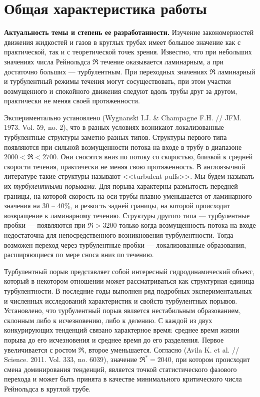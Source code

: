 \nocite{Vest18, MZG2017, MZG2015, Kazan2015, KMU2016, KMU2015, KMU2014} %
\nocite{Lomonosov2018, Lomonosov2017, Lomonosov2016, Lomonosov2015, Lomonosov2014, LomRead2017, LomRead2016, LomRead2014, NeZaTeGiUs2016, NeZaTeGiUs2014, Bur2016, Bur2014, Ob2018, ICMAR2016, Kazan2015conf}

\section*{\centering  Общая характеристика работы}

\textbf{Актуальность темы и степень ее разработанности.}
Изучение закономерностей движения жидкостей и газов в круглых трубах имеет большое значение как с практической, так и с теоретической точек зрения. Известно, что при небольших значениях числа Рейнольдса $\Re$ течение оказывается ламинарным, а при достаточно больших --- турбулентным. При переходных значениях $\Re$ ламинарный и турбулентный режимы течения могут сосуществовать, при этом участки возмущенного и спокойного движения следуют вдоль трубы друг за другом, практически не меняя своей протяженности. 

Экспериментально установлено (Wygnanski I.J. \& Champagne F.H. // JFM. 1973. Vol. 59, no. 2), что в разных условиях возникают локализованные турбулентные структуры заметно разных типов. Структуры первого типа появляются при сильной возмущенности потока на входе в трубу в диапазоне $2000<\Re<2700$. Они сносятся вниз по потоку со скоростью, близкой к средней скорости течения, практически не меняя свою протяженность. В англоязычной литературе такие структуры называют <<turbulent puffs>>. Мы будем называть их \textit{турбулентными порывами}. Для порыва характерны размытость передней границы, на которой скорость на оси трубы плавно уменьшается от ламинарного значения на 30 -- 40\%, и резкость задней границы, на которой происходит возвращение к ламинарному течению. Структуры другого типа --- турбулентные пробки --- появляются при $\Re>3200$ только когда возмущенность потока на входе недостаточна для непосредственного возникновения турбулентности. Тогда возможен переход через турбулентные пробки --- локализованные образования, расширяющиеся по мере сноса вниз по течению. 

Турбулентный порыв представляет собой интересный гидродинамический объект, который в некотором отношении может рассматриваться как структурная единица турбулентности. В последние годы выполнен ряд подробных экспериментальных и численных исследований характеристик и свойств турбулентных порывов. Установлено, что турбулентный порыв является нестабильным образованием, склонным либо к исчезновению, либо к делению. С каждой из двух конкурирующих тенденций связано характерное время: среднее время жизни порыва до его исчезновения и среднее время до его разделения. Первое увеличивается с ростом $\Re$, второе уменьшается. Согласно (Avila K. et al. // Science. 2011. Vol. 333, no. 6039), значение $\Re^*=2040$, при котором происходит смена доминирования тенденций, является точкой статистического фазового перехода и может быть принята в качестве минимального критического числа Рейнольдса в круглой трубе. 

